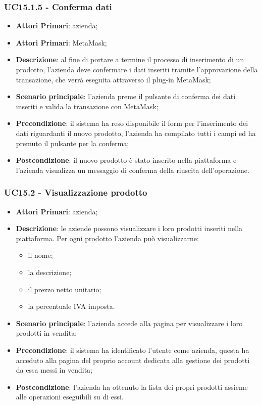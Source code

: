 \subsubsection{UC15.1.5 - Conferma dati}
\begin{itemize}
	\item \textbf{Attori Primari}: azienda;
	\item \textbf{Attori Primari}: MetaMask\glo;
	\item \textbf{Descrizione}: al fine di portare a termine il processo di inserimento di un prodotto, l'azienda deve confermare i dati inseriti tramite l'approvazione della transazione, che verrà eseguita attraverso il plug-in MetaMask\glo;
	\item \textbf{Scenario principale}: l'azienda preme il pulsante di conferma dei dati inseriti e valida la transazione con MetaMask\glo;
	\item \textbf{Precondizione}: il sistema ha reso disponibile il form per l'inserimento dei dati riguardanti il nuovo prodotto, l'azienda ha compilato tutti i campi ed ha premuto il pulsante per la conferma;
	\item \textbf{Postcondizione}: il nuovo prodotto è stato inserito nella piattaforma e l'azienda visualizza un messaggio di conferma della riuscita dell'operazione.
\end{itemize}

\subsubsection{UC15.2 - Visualizzazione prodotto}
\begin{itemize}
	\item \textbf{Attori Primari}: azienda;
	\item \textbf{Descrizione}: le aziende possono visualizzare i loro prodotti inseriti nella piattaforma. Per ogni prodotto l'azienda può visualizzarne:
	\begin{itemize}
		\item il nome;
		\item la descrizione;
		\item il prezzo netto unitario;
		\item la percentuale IVA imposta.
	\end{itemize}
	\item \textbf{Scenario principale}: l'azienda accede alla pagina per visualizzare i loro prodotti in vendita;	

	\item \textbf{Precondizione}: il sistema ha identificato l'utente come azienda, questa ha acceduto alla pagina del proprio account dedicata alla gestione dei prodotti da essa messi in vendita;
	\item \textbf{Postcondizione}: l'azienda ha ottenuto la lista dei propri prodotti assieme alle operazioni eseguibili su di essi.	
\end{itemize}

